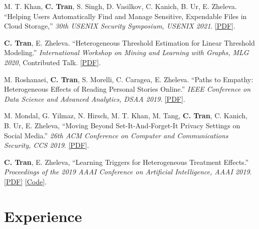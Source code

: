 \documentclass[mm]{simple_style}
\begin{document}
\begin{resume}
M. T. Khan, \textbf{C. Tran}, S. Singh, D. Vasilkov, C. Kanich, B. Ur, E. Zheleva. ``Helping Users Automatically Find and Manage Sensitive, Expendable Files in Cloud Storage,'' \textit{30th USENIX Security Symposium, \textcolor{dorange}{USENIX 2021}}. \href{https://www.cs.uic.edu/~ctran/docs/khan-usenix2021.pdf}{[PDF]}.

\textbf{C. Tran}, E. Zheleva. ``Heterogeneous Threshold Estimation for Linear Threshold Modeling.'' \textit{International Workshop on Mining and Learning with Graphs, \textcolor{dorange}{MLG 2020}}, Contributed Talk. \href{http://www.mlgworkshop.org/2020/papers/MLG2020_paper_23.pdf}{[PDF]}.

M. Roshanaei, \textbf{C. Tran}, S. Morelli, C. Caragea, E. Zheleva. ``Paths to Empathy: Heterogeneous Effects of Reading Personal Stories Online.'' \textit{IEEE Conference on Data Science and Advanced Analytics, \textcolor{dorange}{DSAA 2019}}. \href{https://www.cs.uic.edu/~ctran/docs/roshanaei-dsaa2019.pdf}{[PDF]}.

M. Mondal, G. Yilmaz, N. Hirsch, M. T. Khan, M. Tang, \textbf{C. Tran}, C. Kanich, B. Ur, E. Zheleva, ``Moving Beyond Set-It-And-Forget-It Privacy Settings on Social Media.'' \textit{26th ACM Conference on Computer and Communications Security, \textcolor{dorange}{CCS 2019}}. \href{https://www.cs.uic.edu/~ctran/docs/mondal-ccs2019.pdf}{[PDF]}.

\textbf{C. Tran}, E. Zheleva, ``Learning Triggers for Heterogeneous Treatment Effects.'' \textit{Proceedings of the 2019 AAAI Conference on Artificial Intelligence, \textcolor{dorange}{AAAI 2019}}. \href{https://arxiv.org/pdf/1902.00087.pdf}{[PDF]} \href{https://github.com/edgeslab/CTL}{[Code]}.

\vspace{-2ex}
\sectionline



\section{Experience}


\end{resume}
\end{document}

